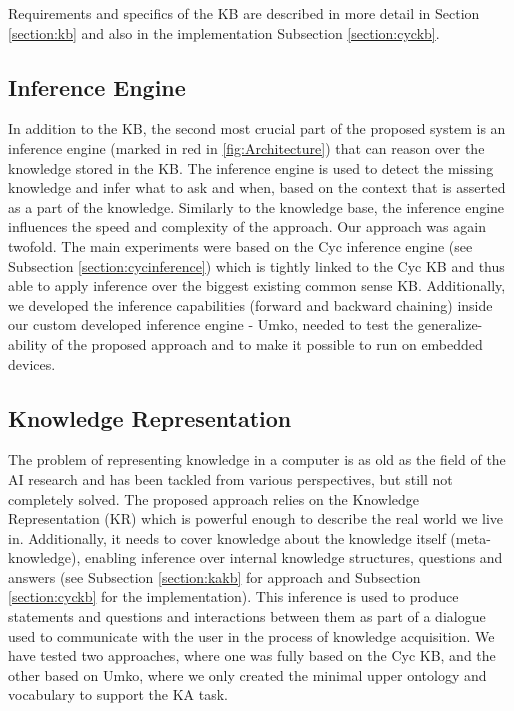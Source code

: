 Requirements and specifics of the KB are described in more detail in 
Section \ref{section:kb} and also in the implementation Subsection \ref{section:cyckb}.

\subsection{Inference Engine}
\label{section:bg:inference}
In addition to the KB, the second most crucial part of the proposed system is an 
inference engine (marked in red in \autoref{fig:Architecture}) that can reason 
over the knowledge stored in the KB. The inference engine is used to detect 
the missing knowledge and infer what to ask and when, based on the context 
that is asserted as a part of the knowledge. Similarly to the knowledge base, 
the inference engine influences the speed and complexity of the approach. Our 
approach was again twofold. The main experiments were based on the Cyc 
inference engine (see Subsection \ref{section:cycinference}) which is tightly linked 
to the Cyc KB and thus able to apply inference over the biggest existing 
common sense KB. Additionally, we developed the inference capabilities 
(forward and backward chaining) inside our custom developed inference 
engine - Umko, needed to test the generalize-ability of the proposed approach 
and to make it possible to run on embedded devices.

\subsection{Knowledge Representation}
\label{section:bg:representation}
The problem of representing knowledge in a computer is as old as the field of 
the AI research and has been tackled from various perspectives, but still not 
completely solved. The proposed approach relies on the Knowledge Representation
(KR) which is powerful 
enough to describe the real world we live in. Additionally, it needs to cover 
knowledge about the knowledge itself (meta-knowledge), enabling inference over 
internal knowledge structures, questions and answers (see Subsection \ref{section:kakb}
for approach and Subsection \ref{section:cyckb} for the implementation). 
This inference is used to 
produce statements and questions and interactions between them as part of a 
dialogue used to communicate with the user in the process of knowledge 
acquisition. We have tested two approaches, where one was fully based on 
the Cyc KB, and the other based on Umko, where we only created the 
minimal upper ontology and vocabulary to support the KA task. 

